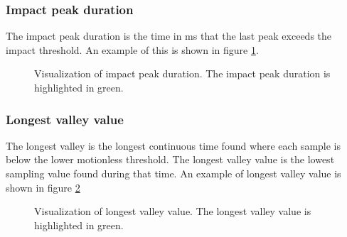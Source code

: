 \documentclass[12pt, a4paper, onecolumn]{article}
\begin{document}
	\subsubsection{Impact peak duration}
	
	The impact peak duration is the time in ms that the last peak exceeds the impact threshold. An example of this is shown in figure \ref{fig:fall-data-impact-peak-duration}.
	
	\begin{figure}[H]
		\centering
		\caption{Visualization of impact peak duration. The impact peak duration is highlighted in green.}%
		\label{fig:fall-data-impact-peak-duration}%
	\end{figure}
	
	\subsubsection{Longest valley value}
	
	The longest valley is the longest continuous time found where each sample is below the lower motionless threshold. The longest valley value is the lowest sampling value found during that time. An example of longest valley value is shown in figure \ref{fig:fall-data-longest-valley-value}
	
	\begin{figure}[H]
		\centering
		\caption{Visualization of longest valley value. The longest valley value is highlighted in green.}%
		\label{fig:fall-data-longest-valley-value}%
	\end{figure}
	
\end{document}
